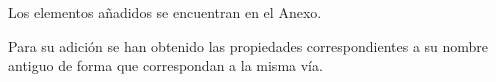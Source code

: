 \begin{itemize}
Los elementos añadidos se encuentran en el Anexo.













Para su adición se han obtenido las propiedades correspondientes a su nombre antiguo de forma que correspondan a la misma vía.









\end{itemize}






